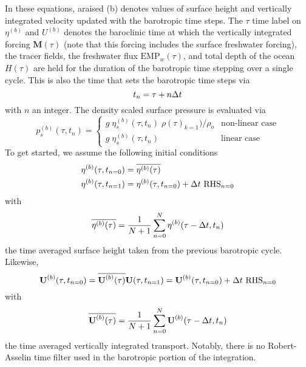 \documentclass[../tex_main/NEMO_manual]{subfiles}
\begin{document}
{In these equations, araised (b) denotes values of surface height and vertically integrated velocity updated with
the barotropic time steps.
The $\tau$ time label on $\eta^{(b)}$ and $U^{(b)}$ denotes the baroclinic time at which
the vertically integrated forcing $\textbf{M}(\tau)$
(note that this forcing includes the surface freshwater forcing),
the tracer fields, the freshwater flux $\text{EMP}_w(\tau)$,
and total depth of the ocean $H(\tau)$ are held for the duration of the barotropic time stepping over
a single cycle.
This is also the time that sets the barotropic time steps via 
\begin{equation} \label{eq:DYN_spg_ts_t}
t_n=\tau+n\Delta t   
\end{equation}
with $n$ an integer.
The density scaled surface pressure is evaluated via 
\begin{equation} \label{eq:DYN_spg_ts_ps}
p_s^{(b)}(\tau,t_{n}) = \begin{cases}
	g \;\eta_s^{(b)}(\tau,t_{n}) \;\rho(\tau)_{k=1}) / \rho_o  &      \text{non-linear case} \\
	g \;\eta_s^{(b)}(\tau,t_{n})  &      \text{linear case} 
	\end{cases}
\end{equation}
To get started, we assume the following initial conditions 
\begin{equation} \label{eq:DYN_spg_ts_eta}
\begin{split}
\eta^{(b)}(\tau,t_{n=0}) &= \overline{\eta^{(b)}(\tau)}
\\
\eta^{(b)}(\tau,t_{n=1}) &= \eta^{(b)}(\tau,t_{n=0}) + \rdt \ \text{RHS}_{n=0} 
\end{split}
\end{equation}
with 
\begin{equation} \label{eq:DYN_spg_ts_etaF}
 \overline{\eta^{(b)}(\tau)} = \frac{1}{N+1} \sum\limits_{n=0}^N \eta^{(b)}(\tau-\Delta t,t_{n})
\end{equation}
the time averaged surface height taken from the previous barotropic cycle.
Likewise, 
\begin{equation} \label{eq:DYN_spg_ts_u}
\textbf{U}^{(b)}(\tau,t_{n=0}) = \overline{\textbf{U}^{(b)}(\tau)}	\\
\\
\textbf{U}(\tau,t_{n=1}) = \textbf{U}^{(b)}(\tau,t_{n=0}) + \rdt \ \text{RHS}_{n=0}  	
\end{equation}
with 
\begin{equation} \label{eq:DYN_spg_ts_u}
 \overline{\textbf{U}^{(b)}(\tau)} 
 	= \frac{1}{N+1} \sum\limits_{n=0}^N\textbf{U}^{(b)}(\tau-\Delta t,t_{n})
\end{equation}
the time averaged vertically integrated transport.
Notably, there is no Robert-Asselin time filter used in the barotropic portion of the integration. 

}
\end{document}
